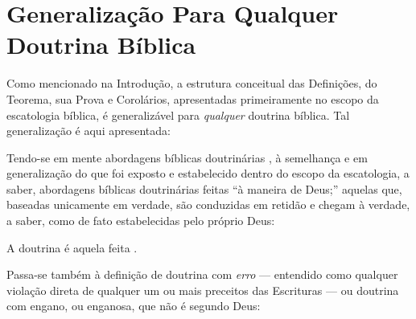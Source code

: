 
\appendix



\section{Generalização Para Qualquer Doutrina Bíblica}

    Como mencionado na Introdução, a estrutura conceitual das Definições, do  Teorema,  sua  Prova  e  Corolários,  apresentadas
    primeiramente no escopo da escatologia bíblica, é generalizável para \emph{qualquer} doutrina bíblica. Tal  generalização  é
    aqui apresentada:

    Tendo-se em mente abordagens bíblicas doutrinárias , à semelhança e em generalização do que foi exposto
    e estabelecido dentro do escopo da escatologia, a saber, abordagens bíblicas doutrinárias feitas ``à maneira de  Deus;''
    aquelas que, baseadas unicamente  em verdade, são conduzidas em retidão e chegam à verdade, a saber, como de fato
    estabelecidas pelo próprio Deus:

    \begin{DEF}
        \label{def.dou.segDeus}
        A doutrina  é aquela feita .
    \end{DEF}

    Passa-se também à definição de doutrina com \emph{erro} --- entendido como qualquer violação direta de qualquer um  ou  mais
    preceitos das Escrituras --- ou doutrina com engano, ou enganosa, que não é segundo Deus:

